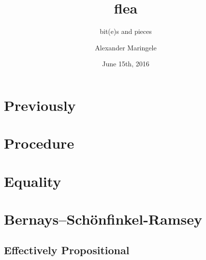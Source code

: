 



\author{Alexander Maringele}
\title{flea\\
}
\subtitle{bit(e)s and pieces}
\date{June 15th, 2016}

%



 



\frame{
	\setcounter{tocdepth}{1}
	\tableofcontents}

%

%


\section{Previously}



\section{Procedure}



\section{Equality}



\section{Bernays–Schönfinkel-Ramsey}

\subsection{Effectively Propositional}

